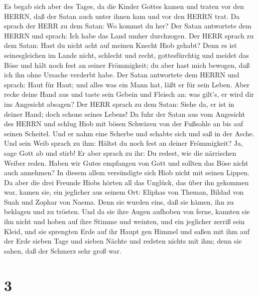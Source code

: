  Es begab sich aber des Tages, da die Kinder Gottes kamen
und traten vor den HERRN, daß der Satan auch unter ihnen kam und vor den
HERRN trat.  Da sprach der HERR zu dem Satan: Wo kommst du
her? Der Satan antwortete dem HERRN und sprach: Ich habe das Land umher
durchzogen.  Der HERR sprach zu dem Satan: Hast du nicht
acht auf meinen Knecht Hiob gehabt? Denn es ist seinesgleichen im Lande
nicht, schlecht und recht, gottesfürchtig und meidet das Böse und hält
noch fest an seiner Frömmigkeit; du aber hast mich bewogen, daß ich ihn
ohne Ursache verderbt habe.  Der Satan antwortete dem HERRN
und sprach: Haut für Haut; und alles was ein Mann hat, läßt er für sein
Leben.  Aber recke deine Hand aus und taste sein Gebein und
Fleisch an: was gilt's, er wird dir ins Angesicht absagen? 
Der HERR sprach zu dem Satan: Siehe da, er ist in deiner Hand; doch
schone seines Lebens!  Da fuhr der Satan aus vom Angesicht
des HERRN und schlug Hiob mit bösen Schwären von der Fußsohle an bis auf
seinen Scheitel.  Und er nahm eine Scherbe und schabte sich
und saß in der Asche.  Und sein Weib sprach zu ihm: Hältst
du noch fest an deiner Frömmigkeit? Ja, sage Gott ab und stirb!
 Er aber sprach zu ihr: Du redest, wie die närrischen
Weiber reden. Haben wir Gutes empfangen von Gott und sollten das Böse
nicht auch annehmen? In diesem allem versündigte sich Hiob nicht mit
seinen Lippen.  Da aber die drei Freunde Hiobs hörten all
das Unglück, das über ihn gekommen war, kamen sie, ein jeglicher aus
seinem Ort: Eliphas von Theman, Bildad von Suah und Zophar von Naema.
Denn sie wurden eins, daß sie kämen, ihn zu beklagen und zu trösten.
 Und da sie ihre Augen aufhoben von ferne, kannten sie ihn
nicht und hoben auf ihre Stimme und weinten, und ein jeglicher zerriß
sein Kleid, und sie sprengten Erde auf ihr Haupt gen Himmel
 und saßen mit ihm auf der Erde sieben Tage und sieben
Nächte und redeten nichts mit ihm; denn sie sahen, daß der Schmerz sehr
groß war.

\hypertarget{section-2}{%
\section{3}\label{section-2}}

